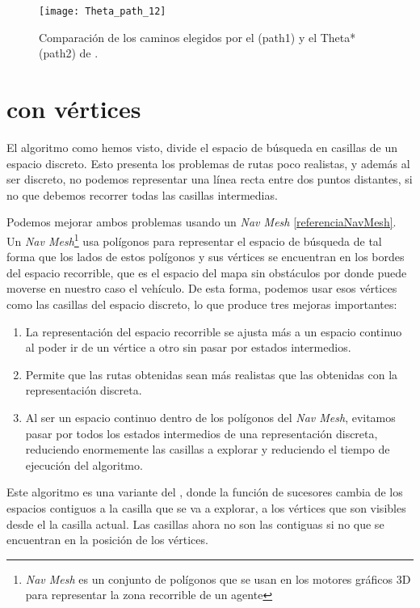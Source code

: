 \begin{figure}[htpb]
    \centering
    \texttt{[image: Theta\_path\_12]}
    \caption[Comparación de los caminos elegidos por el \Astar y el Theta*]{Comparación de los caminos elegidos por el \Astar (path1) y el Theta* (path2) de \cite{thetaestrellawebimagen}.}
    \label{fig:basics AFM sketch}
\end{figure}

\section{\Astar con vértices} \label{avertices}
El algoritmo \Astar como hemos visto, divide el espacio de búsqueda en casillas de un espacio discreto. Esto presenta los problemas de rutas poco realistas, y además al ser discreto, no podemos representar una línea recta entre dos puntos distantes, si no que debemos recorrer todas las casillas intermedias.

Podemos mejorar ambos problemas usando un \textit{Nav Mesh} \ref{referenciaNavMesh}.  Un \textit{Nav Mesh}\footnote{\textit{Nav Mesh} es un conjunto de polígonos que se usan en los motores gráficos 3D para representar la zona recorrible de un agente} usa polígonos para representar el espacio de búsqueda de tal forma que los lados de estos polígonos y sus vértices se encuentran en los bordes del espacio recorrible, que es el espacio del mapa sin obstáculos por donde puede moverse en nuestro caso el vehículo. De esta forma, podemos usar esos vértices como las casillas del espacio discreto, lo que produce tres mejoras importantes:

\begin{enumerate}
\item La representación del espacio recorrible se ajusta más a un espacio continuo al poder ir de un vértice a otro sin pasar por estados intermedios.
\item Permite que las rutas obtenidas sean más realistas que las obtenidas con la representación discreta.
\item Al ser un espacio continuo dentro de los polígonos del \textit{Nav Mesh}, evitamos pasar por todos los estados intermedios de una representación discreta, reduciendo enormemente las casillas a explorar y reduciendo el tiempo de ejecución del algoritmo.
\end{enumerate}

Este algoritmo es una variante del \Astar, donde la función de sucesores cambia de los espacios contiguos a la casilla que se va a explorar, a los vértices que son visibles desde el la casilla actual. Las casillas ahora no son las contiguas si no que se encuentran en la posición de los vértices.

